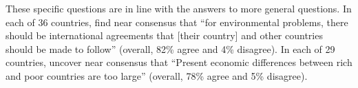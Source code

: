 These specific questions are in line with the answers to more general questions. In each of 36 countries, \citet{issp_international_2010} find near consensus that ``for environmental problems, there should be international agreements that [their country] and other countries should be made to follow'' (overall, 82\% agree and 4\% disagree). %
In each of 29 countries, \citet{issp_international_2019} uncover near consensus that ``Present economic differences between rich and poor countries are too large'' (overall, 78\% agree and 5\% disagree). 


